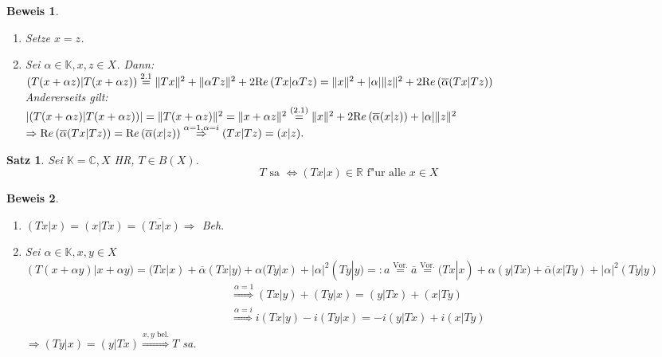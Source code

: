 \documentclass[a4paper,11pt]{book}
\newcommand{\R}{{\mathbb R}}
\newcommand{\C}{{\mathbb C}}
\newcommand{\K}{{\mathbb K}}
\newcommand{\re}{\ensuremath{\text Re}\,}
\newtheorem{Sa}[Def]{Satz}
\theoremstyle{nonumberplain}
\newtheorem{Bew}{Beweis}
\begin{document}
\begin{Bew}
\begin{enumerate}
\item["` $\Leftarrow$ "'] Setze $x = z$.

\item["` $\Rightarrow$ "´] Sei $\alpha \in \K, x,z \in X$. Dann:\\
$(T(x+\alpha z)|T(x+\alpha z)) \stackrel{2.1}{=} \|Tx\|^2 + \|\alpha Tz\|^2 + 2 \re (Tx|\alpha Tz) = \|x\|^2 + |\alpha| \|z\|^2 + 2 \re (\overline{\alpha}(Tx|Tz))$\\
Andererseits gilt:\\
$|(T(x+\alpha z)|T(x+\alpha z))| = \|T(x+\alpha z)\|^2 = \|x+\alpha z\|^2 \stackrel{(2.1)}{=} \|x\|^2 + 2 \re (\overline{\alpha}(x|z)) + |\alpha| \|z\|^2$\\
$\Rightarrow \re(\overline{\alpha}(Tx|Tz)) = \re(\overline{\alpha}(x|z)) \stackrel{\alpha=1,\alpha=i}{\Rightarrow} (Tx|Tz) = (x|z).$
\end{enumerate}
\end{Bew}


\begin{Sa}
Sei $\K = \C, X$ HR, $T \in B(X)$.
\[
T \text{ sa } \Leftrightarrow (Tx|x) \in \R \text{ f"ur alle } x \in X
\]
\end{Sa}

\begin{Bew}
\begin{enumerate}
\item["` $\Rightarrow$ "´] $(Tx|x) = (x|Tx) = \overline{(Tx|x)} \Rightarrow$ Beh.

\item["` $\Leftarrow$ "´] Sei $\alpha \in \K, x,y \in X$\\
$(T(x+\alpha y)|x+\alpha y) = (Tx|x) + \overline{\alpha} (Tx|y) + \alpha (Ty|x) + |\alpha|^2(Ty|y) =: a \stackrel{\text{Vor.}}{=} \overline{a} \stackrel{\text{Vor.}}{=} (Tx|x) + \alpha(y|Tx) + \overline{\alpha}(x|Ty) + |\alpha|^2(Ty|y)$
\begin{eqnarray}
\stackrel{\alpha = 1}{\Rightarrow} (Tx|y) + (Ty|x) = (y|Tx) + (x|Ty) \\
\stackrel{\alpha = i}{\Rightarrow} i(Tx|y) - i(Ty|x) = -i(y|Tx) + i(x|Ty) \\
\end{eqnarray}
$\Rightarrow (Ty|x) = (y|Tx) \stackrel{x,y \text{ bel.}}{\Rightarrow} T$ sa.
\end{enumerate}
\end{Bew}
\end{document}
